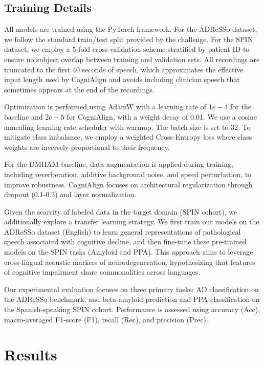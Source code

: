 \documentclass{Odyssey2026}
\begin{document}
\subsection{Training Details}
All models are trained using the PyTorch framework. For the ADReSSo dataset, we follow the standard train/test split provided by the challenge. For the SPIN dataset, we employ a 5-fold cross-validation scheme stratified by patient ID to ensure no subject overlap between training and validation sets. All recordings are truncated to the first 40 seconds of speech, which approximates the effective input length used by CogniAlign and avoids including clinician speech that sometimes appears at the end of the recordings.

Optimization is performed using AdamW with a learning rate of $1e-4$ for the baseline and $2e-5$ for CogniAlign, with a weight decay of 0.01. We use a cosine annealing learning rate scheduler with warmup. The batch size is set to 32. To mitigate class imbalance, we employ a weighted Cross-Entropy loss where class weights are inversely proportional to their frequency.

For the DMHAM baseline, data augmentation is applied during training, including reverberation, additive background noise, and speed perturbation, to improve robustness. CogniAlign focuses on architectural regularization through dropout (0.1-0.3) and layer normalization.

Given the scarcity of labeled data in the target domain (SPIN cohort), we additionally explore a transfer learning strategy. We first train our models on the ADReSSo dataset (English) to learn general representations of pathological speech associated with cognitive decline, and then fine-tune these pre-trained models on the SPIN tasks (Amyloid and PPA). This approach aims to leverage cross-lingual acoustic markers of neurodegeneration, hypothesizing that features of cognitive impairment share commonalities across languages.

Our experimental evaluation focuses on three primary tasks: AD classification on the ADReSSo benchmark, and beta-amyloid prediction and PPA classification on the Spanish-speaking SPIN cohort. Performance is assessed using accuracy (Acc), macro-averaged F1-score (F1), recall (Rec), and precision (Prec).

\section{Results}
\end{document}

